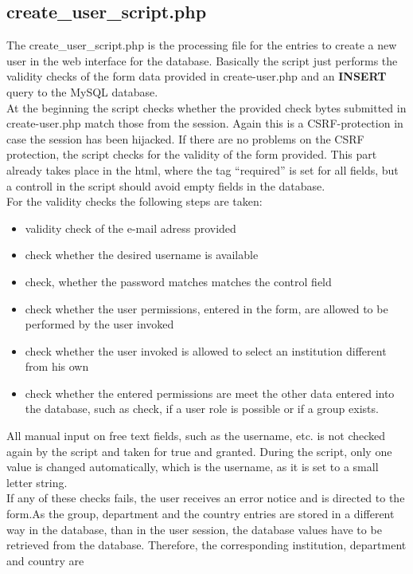 \subsection{create\_user\_script.php}
The create\_user\_script.php is the processing file for the entries to create a new user in the web interface for the database. Basically the script just performs the validity checks 
of the form data provided in create-user.php and an \textbf{INSERT} query to the MySQL database.\\
At the beginning the script checks whether the provided check bytes submitted in create-user.php match those from the session. Again this is a CSRF-protection in case the session has
been hijacked. If there are no problems on the CSRF protection, the script checks for the validity of the form provided. This part already takes place in the html, where the tag 
``required'' is set for all fields, but a controll in the script should avoid empty fields in the database.\\
For the validity checks the following steps are taken:
\begin{itemize}
 \item validity check of the e-mail adress provided
 \item check whether the desired username is available
 \item check, whether the password matches matches the control field
 \item check whether the user permissions, entered in the form, are allowed to be performed by the user invoked
 \item check whether the user invoked is allowed to select an institution different from his own
 \item check whether the entered permissions are meet the other data entered into the database, such as check, if a user role is possible or if a group exists.
\end{itemize}
All manual input on free text fields, such as the username, etc. is not checked again by the script and taken for true and granted. During the script, only one value is changed 
automatically, which is the username, as it is set to a small letter string.\\
If any of these checks fails, the user receives an error notice and is directed to the form.As the group, department and the country entries are stored in a different
way in the database, than in the user session, the database values have to be retrieved from the database. Therefore, the corresponding institution, department and country are 
